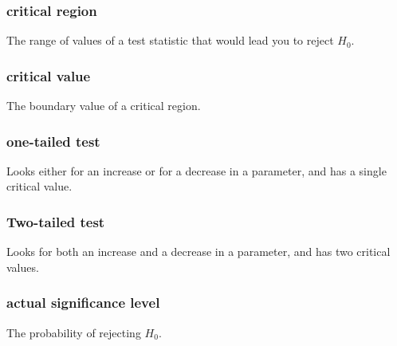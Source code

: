 \documentclass[a4paper,9pt]{scrartcl}
\begin{document}
    \subsubsection{critical region}

    The range of values of a test statistic that would lead you to reject $H_0$.

    \subsubsection{critical value}

    The boundary value of a critical region.

    \subsubsection{one-tailed test}

    Looks either for an increase or for a decrease in a parameter, and has a single critical value.

    \subsubsection{Two-tailed test}

    Looks for both an increase and a decrease in a parameter, and has two critical values.

    \subsubsection{actual significance level}

    The probability of rejecting $H_0$.
\end{document}
